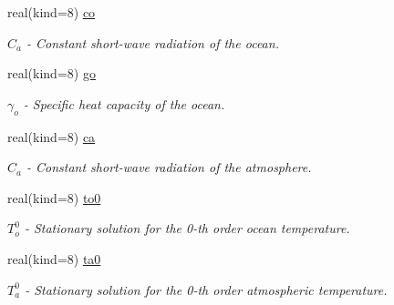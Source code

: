 \begin{DoxyCompactItemize}
real(kind=8) \hyperlink{structparams_1_1physicsconfiguration_a24f09fe4d8acd7e961f3ce05245a8252}{co}
\begin{DoxyCompactList}\small\item\em $C_a$ -\/ Constant short-\/wave radiation of the ocean. \end{DoxyCompactList}\item 
\mbox{\label{structparams_1_1physicsconfiguration_a4a6c09f2e8a5081c69c682a8ffb265b2}} 
real(kind=8) \hyperlink{structparams_1_1physicsconfiguration_a4a6c09f2e8a5081c69c682a8ffb265b2}{go}
\begin{DoxyCompactList}\small\item\em $\gamma_o$ -\/ Specific heat capacity of the ocean. \end{DoxyCompactList}\item 
\mbox{\label{structparams_1_1physicsconfiguration_afd12e4ad7115bb202bc7517e3aac2b88}} 
real(kind=8) \hyperlink{structparams_1_1physicsconfiguration_afd12e4ad7115bb202bc7517e3aac2b88}{ca}
\begin{DoxyCompactList}\small\item\em $C_a$ -\/ Constant short-\/wave radiation of the atmosphere. \end{DoxyCompactList}\item 
\mbox{\label{structparams_1_1physicsconfiguration_a80056e4938882e04286264a6b9d02a1c}} 
real(kind=8) \hyperlink{structparams_1_1physicsconfiguration_a80056e4938882e04286264a6b9d02a1c}{to0}
\begin{DoxyCompactList}\small\item\em $T_o^0$ -\/ Stationary solution for the 0-\/th order ocean temperature. \end{DoxyCompactList}\item 
\mbox{\label{structparams_1_1physicsconfiguration_a9a3e54eef169ac6cf3949f2f25210fa2}} 
real(kind=8) \hyperlink{structparams_1_1physicsconfiguration_a9a3e54eef169ac6cf3949f2f25210fa2}{ta0}
\begin{DoxyCompactList}\small\item\em $T_a^0$ -\/ Stationary solution for the 0-\/th order atmospheric temperature. \end{DoxyCompactList}\item 

\end{DoxyCompactItemize}
